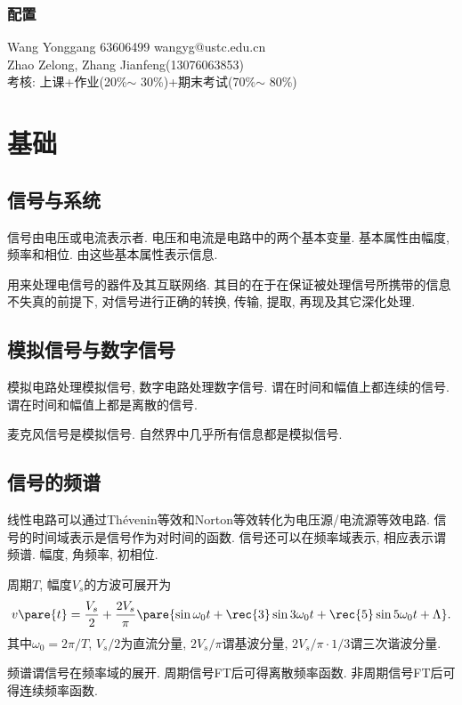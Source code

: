 \documentclass[hidelinks]{ctexart}
\begin{document}
\subsubsection*{配置} %
\label{ssub:配置}

\noindent
Wang Yonggang 63606499 wangyg@ustc.edu.cn\\
Zhao Zelong, Zhang Jianfeng(13076063853)\\
考核: 上课+作业(20\%$\sim$ 30\%)+期末考试(70\%$\sim$ 80\%)


\section{基础} %
\label{sec:基础}

\subsection{信号与系统} %
\label{sub:信号与系统}

 信号由电压或电流表示者. 电压和电流是电路中的两个基本变量. 基本属性由幅度, 频率和相位. 由这些基本属性表示信息.
\par
{} 用来处理电信号的器件及其互联网络. 其目的在于在保证被处理信号所携带的信息不失真的前提下, 对信号进行正确的转换, 传输, 提取, 再现及其它深化处理.


\subsection{模拟信号与数字信号} %
\label{sub:模拟信号与数字信号}

\newpoint{}模拟电路处理模拟信号, 数字电路处理数字信号.
\newpoint{}谓在时间和幅值上都连续的信号.
\newpoint{}谓在时间和幅值上都是离散的信号.
\begin{ex}
    麦克风信号是模拟信号. 自然界中几乎所有信息都是模拟信号.
\end{ex}


\subsection{信号的频谱} %
\label{sub:信号的频谱}

\newpoint{}线性电路可以通过Th\'evenin等效和Norton等效转化为电压源/电流源等效电路.
\newpoint{}信号的时间域表示是信号作为对时间的函数. 信号还可以在频率域表示, 相应表示谓频谱.
 幅度, 角频率, 初相位.
\begin{ex}
    周期$T$, 幅度$V_s$的方波可展开为
    \[ v\pare{t} = \frac{V_s}{2} + \frac{2V_s}{\pi} \pare{\sin\omega_0 t + \rec{3}\sin 3\omega_0 t + \rec{5}\sin 5\omega_0 t + \Lambda}. \]
    其中$\omega_0 = 2\pi/T$, $V_s/2$为直流分量, $2V_s/\pi$谓基波分量, $2V_s/\pi \cdot 1/3$谓三次谐波分量.
\end{ex}
\newpoint{}频谱谓信号在频率域的展开.
\newpoint{}周期信号FT后可得离散频率函数.
\newpoint{}非周期信号FT后可得连续频率函数.
\end{document}
